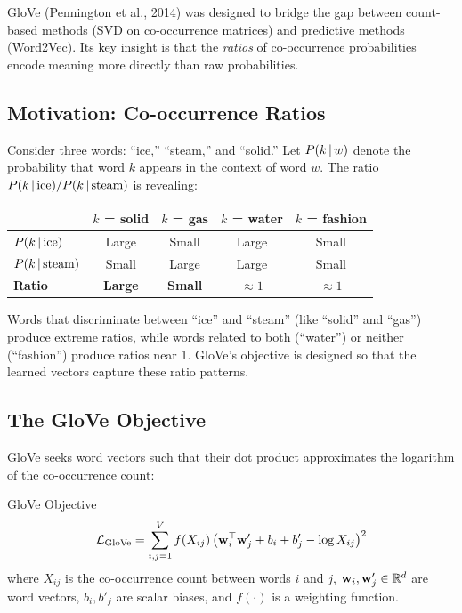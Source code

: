 GloVe (Pennington et al., 2014) was designed to bridge the gap between
count-based methods (SVD on co-occurrence matrices) and predictive methods
(Word2Vec).  Its key insight is that the \emph{ratios} of co-occurrence
probabilities encode meaning more directly than raw probabilities.

\subsection{Motivation: Co-occurrence Ratios}

Consider three words: ``ice,'' ``steam,'' and ``solid.''  Let
$P(k \,|\, w)$ denote the probability that word $k$ appears in the context
of word $w$.  The ratio $P(k \,|\, \text{ice}) / P(k \,|\, \text{steam})$
is revealing:

\begin{table}[H]
\centering
\begin{tabular}{lcccc}
\toprule
& \textbf{$k$ = solid} & \textbf{$k$ = gas} & \textbf{$k$ = water}
& \textbf{$k$ = fashion} \\
\midrule
$P(k \,|\, \text{ice})$ & Large & Small & Large & Small \\
$P(k \,|\, \text{steam})$ & Small & Large & Large & Small \\
\textbf{Ratio} & \textbf{Large} & \textbf{Small} & $\approx 1$ & $\approx 1$ \\
\bottomrule
\end{tabular}
\end{table}

Words that discriminate between ``ice'' and ``steam'' (like ``solid'' and
``gas'') produce extreme ratios, while words related to both (``water'') or
neither (``fashion'') produce ratios near 1.  GloVe's objective is designed
so that the learned vectors capture these ratio patterns.

\subsection{The GloVe Objective}

GloVe seeks word vectors such that their dot product approximates the
logarithm of the co-occurrence count:

\begin{mathresult}{GloVe Objective}
\[
    \mathcal{L}_{\text{GloVe}}
    = \sum_{i,j=1}^{V} f(X_{ij})\,
      \bigl(\mathbf{w}_i^\top \mathbf{w}'_j + b_i + b'_j - \log X_{ij}\bigr)^2
\]
where $X_{ij}$ is the co-occurrence count between words $i$ and $j$,
$\mathbf{w}_i, \mathbf{w}'_j \in \mathbb{R}^d$ are word vectors, $b_i, b'_j$ are scalar biases,
and $f(\cdot)$ is a weighting function.
\end{mathresult}

